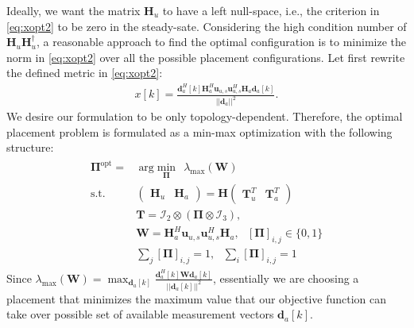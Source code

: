 \documentclass[twocolumn]{IEEEtran}
\newcommand{\mb}{\mathbf}
\begin{document}
Ideally, we want the matrix $\mb{H}_u$ to have a left null-space, i.e., the criterion in \eqref{eq:xopt2} to be zero in the steady-sate. Considering the high condition number of $\mb{H}_u \mb{H}^\dagger_u$, a reasonable approach to find the optimal configuration is to minimize the norm in \eqref{eq:xopt2} over all the possible placement configurations. 
Let first rewrite the defined metric in \eqref{eq:xopt2}:
\begin{align}
x[k]=\frac{\mathbf{d}_a^H[k]\mathbf{H}^H_a \mb{u}_{u,s}\mb{u}^H_{u,s} \mathbf{H}_a\mathbf{d}_a[k]}{||\mb{d}_a||^2}.
\end{align} 
We desire our formulation to be only topology-dependent. Therefore,  the optimal placement problem is formulated as a min-max optimization with the following structure:    
\begin{align}
\label{eq.optimization}
\begin{split}
\mathbf {\Pi}^\text{opt}=&~
\mbox{arg}\!\min_{\mathbf \Pi}~~ \lambda_{\max}(\mb{W}) 
\\
\mbox{s.t.}
~~&\left(\!\!
\begin{array}{c|c}
{\mathbf H}_u&{\mathbf H}_a
\end{array}\!\!
\right)=\mathbf H \left(\!\!
\begin{array}{c|c}
{\mathbf T}^T_u&{\mathbf T}^T_a
\end{array}\!\!\right)
\\
&\mb{T}=\mathcal{I}_2 \otimes (\mb{\Pi} \otimes \mathcal{I}_3),
\\
&\mb{W}=\mathbf{H}^H_a \mb{u}_{u,s}\mb{u}^H_{u,s} \mathbf{H}_a
,~~~[\mathbf{\Pi}]_{i,j} \in \{0,1\}\\
&
\sum_{j} [\mathbf{\Pi}]_{i,j}=1,~~~\sum_{i} [\mathbf{\Pi}]_{i,j} = 1
\end{split}
\end{align} 
Since $\lambda_{\max}(\mb{W})=\max_{\mb{d}_a[k]}\frac{\mathbf{d}_a^H[k] \mb{W} \mathbf{d}_a[k]}{||\mb{d}_a[k]||^2}$, essentially we are choosing a placement that minimizes the maximum value that our objective function can take over possible set of available measurement vectors $\mb{d}_a[k]$.
\end{document}
